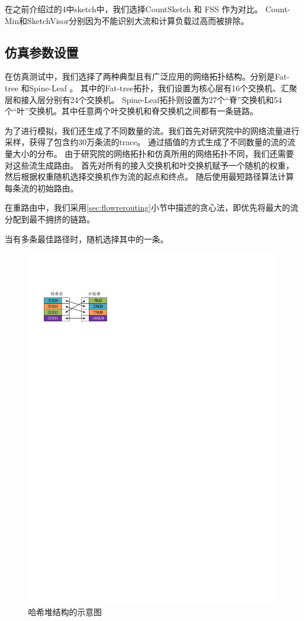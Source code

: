 在之前介绍过的4中sketch中，我们选择CountSketch \cite{charikar2004finding} 和 FSS \cite{homem2010finding}作为对比。
Count-Min\cite{cormode2004improved}和SketchVisor\cite{huang2017sketchvisor}分别因为不能识别大流和计算负载过高而被排除。

\subsection{仿真参数设置}\label{subsec:simulationsetting}

在仿真测试中，我们选择了两种典型且有广泛应用的网络拓扑结构。分别是Fat-tree \cite{al2008scalable}和Spine-Leaf \cite{alizadeh2013data}。
其中的Fat-tree拓扑，我们设置为核心层有16个交换机、汇聚层和接入层分别有24个交换机。
Spine-Leaf拓扑则设置为27个“脊”交换机和54个“叶”交换机。其中任意两个叶交换机和脊交换机之间都有一条链路。

为了进行模拟，我们还生成了不同数量的流。我们首先对研究院中的网络流量进行采样，获得了包含约30万条流的trace。
通过插值的方式生成了不同数量的流的流量大小的分布。
由于研究院的网络拓扑和仿真所用的网络拓扑不同，我们还需要对这些流生成路由。
首先对所有的接入交换机和叶交换机赋予一个随机的权重，然后根据权重随机选择交换机作为流的起点和终点。
随后使用最短路径算法计算每条流的初始路由。

在重路由中，我们采用\ref{sec:flowrerouting}小节中描述的贪心法，即优先将最大的流分配到最不拥挤的链路。

当有多条最佳路径时，随机选择其中的一条。

\begin{figure}
    \centering
    \includegraphics[width=0.6\linewidth]{fig/hashheap.pdf}
    \caption{\textnormal{哈希堆结构的示意图}}
	\label{fig:hashheap}
 \end{figure}

